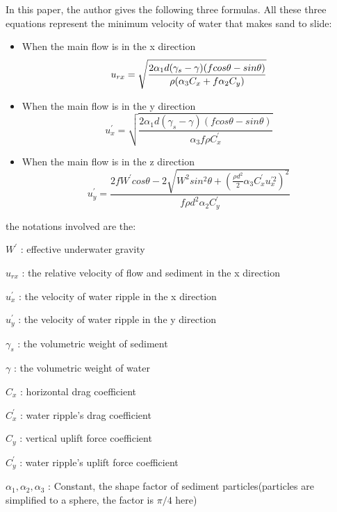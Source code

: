\documentclass[13pt]{ctexart}
\begin{document}
	In this paper\cite{马子普Discussion}, the author gives the following three formulas. All these three equations represent the minimum velocity of water that makes sand to slide:
	
	\begin{itemize}
		\item When the main flow is in the x direction
		\begin{equation}
		\centering
		u_{rx} = \sqrt{\frac{2\alpha _{1}d(\gamma _{s}-\gamma)(fcos\theta - sin \theta)}{\rho (\alpha _{3}C_{x}+f\alpha_{2}C_{y})}}
		\end{equation}
		\item When the main flow is in the y direction
		\begin{equation}
		u_{x}^{'} = \sqrt{\frac{2\alpha _{1}d(\gamma _{s}-\gamma)(fcos\theta - sin \theta)}{\alpha _{3}f\rho C_{x}^{'}}}
		\end{equation}
		\item When the main flow is in the z direction
		\begin{equation}
		u_{y}^{'} = \frac{2fW^{'}cos\theta -2\sqrt{W^{2}sin^{2}\theta + {(\frac{\rho d^{2}}{2}\alpha _{3}C_{x}^{'}u_{x}^{'2})}^2}}{f\rho d^{2} \alpha _{2}C_{y}^{'}}
		\end{equation}
	\end{itemize}
	
	the notations involved are the:
	
	$W^{'}$ : effective underwater gravity
	
	$u_{rx}$ : the relative velocity of flow and sediment in the x direction
	
	$u_{x}^{'}$ : the velocity of water ripple in the x direction
	
	$u_{y}^{'}$ : the velocity of water ripple in the y direction
	
	$\gamma_s$ : the volumetric weight of sediment
	
	$\gamma$ : the volumetric weight of water
	
	$C_{x}$ : horizontal drag coefficient
	
	$C_{x}^{'}$ : water ripple's drag coefficient
	
	$C_{y}$ : vertical uplift force coefficient
	
	$C_{y}^{'}$ : water ripple's uplift force coefficient
	
	$\alpha_{1},\alpha_{2},\alpha_{3}$ : Constant, the shape factor of sediment particles(particles are simplified to a sphere, the factor is $\pi/4$ here)
	
\end{document}
